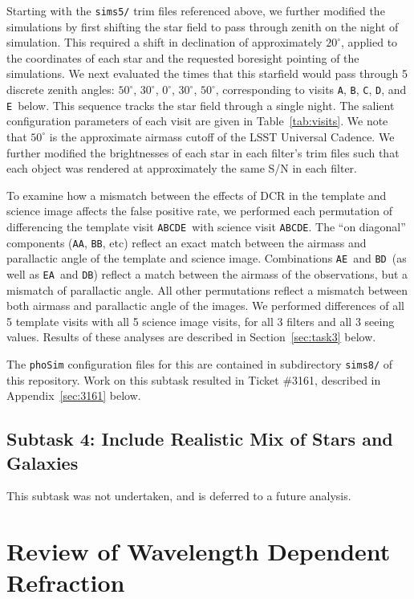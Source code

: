 \documentclass[prd, nofootinbib, floatfix, 11pt, tightenlines, times]{article}
\def\A{{\tt A}}
\def\B{{\tt B}}
\def\C{{\tt C}}
\def\D{{\tt D}}
\def\E{{\tt E}}
\begin{document}
Starting with the {\tt sims5/} trim files referenced above, we further
modified the simulations by first shifting the star field to pass
through zenith on the night of simulation.  This required a shift in
declination of approximately $20^{\circ}$, applied to the coordinates
of each star and the requested boresight pointing of the simulations.
We next evaluated the times that this starfield would pass through 5
discrete zenith angles: $50^{\circ}$, $30^{\circ}$, $0^{\circ}$,
$30^{\circ}$, $50^{\circ}$, corresponding to visits \A, \B, \C, \D,
and \E\ below.  This sequence tracks the star field through a single
night.  The salient configuration parameters of each visit are given
in Table~\ref{tab:visits}.  We note that $50^{\circ}$ is the
approximate airmass cutoff of the LSST Universal Cadence.  We further
modified the brightnesses of each star in each filter's trim files
such that each object was rendered at approximately the same S/N in
each filter.

To examine how a mismatch between the effects of DCR in the template
and science image affects the false positive rate, we performed each
permutation of differencing the template visit \A\B\C\D\E\ with
science visit \A\B\C\D\E.  The ``on diagonal'' components (\A\A, \B\B,
etc) reflect an exact match between the airmass and parallactic angle
of the template and science image.  Combinations \A\E\ and \B\D\ (as
well as \E\A\ and \D\B) reflect a match between the airmass of the
observations, but a mismatch of parallactic angle.  All other
permutations reflect a mismatch between both airmass and parallactic
angle of the images.  We performed differences of all 5 template
visits with all 5 science image visits, for all 3 filters and all 3
seeing values.  Results of these analyses are described in
Section~\ref{sec:task3} below.

The {\tt phoSim} configuration files for this are contained in
subdirectory {\tt sims8/} of this repository.  Work on this subtask
resulted in Ticket \#3161, described in Appendix~\ref{sec:3161} below.

\subsection{Subtask 4: Include Realistic Mix of Stars and Galaxies}

This subtask was not undertaken, and is deferred to a future analysis.

\section{Review of Wavelength Dependent Refraction \label{sec:theory}}
\end{document}
